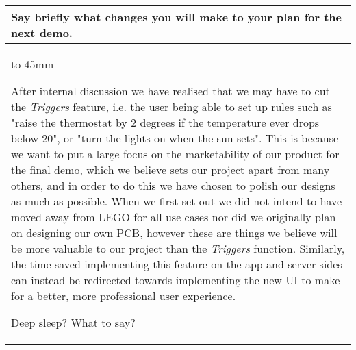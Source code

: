 \documentclass[a4paper]{article}
\newcommand{\colWidth}{141mm}
\begin{document}
\begin{center}

\begin{tabular}{|p{\colWidth}|}
	\hline
	\cellcolor{blue!25}\large
	\textbf{Say briefly what changes you will make to your plan for the next demo.}
	\\ \hline
	\vtop to 45mm{
		After internal discussion we have realised that we may have to cut the \textit{Triggers} feature,
		i.e. the user being able to set up rules such as "raise the thermostat by 2 degrees if the temperature ever drops below 20",
		or "turn the lights on when the sun sets".
		This is because we want to put a large focus on the marketability of our product for the final demo, which we believe sets
		our project apart from many others, and in order to do this we have chosen to polish our designs as much as possible.
		When we first set out we did not intend to have moved away from LEGO for all use cases nor did we originally plan on designing our own PCB, however these are things we believe will be more valuable to our project than the \textit{Triggers} function.
		Similarly, the time saved implementing this feature on the app and server sides can instead be redirected towards implementing the new UI to make for a better, more professional user experience.
		
		\vspace{3mm}
		
		{\color{red} Deep sleep? What to say?}
		
  	}
  \\
  \hline
\end{tabular}

\end{center}
  
\end{document}
